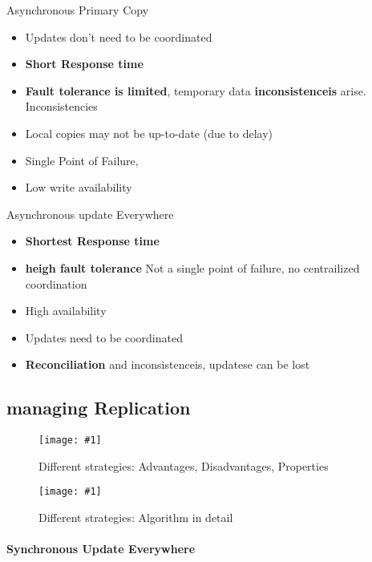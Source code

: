 \documentclass[a4paper,12pt]{article}%
\newcommand{\grafik}[2]{\begin{figure}[!htb]
		\noindent\texttt{[image: \#1]}
		\caption{\textrm{#2}}%
	\end{figure}}
\begin{document}
 Asynchronous Primary Copy
 
 {\color[HTML]{9AB299} 
 \begin{itemize}
  \item Updates don't need to be coordinated
  \item {\bf Short Response time}
 \end{itemize}

 }   
{\color[HTML]{A38C8C}
 \begin{itemize}
 \item {\bf Fault tolerance is limited}, temporary data {\bf inconsistenceis} arise. Inconsistencies 
 \item Local copies may not be up-to-date (due to delay)
 \item Single Point of Failure,
 \item Low write availability
 \end{itemize}
 }

 
 
 Asynchronous update Everywhere
 
 {\color[HTML]{9AB299} 
 \begin{itemize}
  \item {\bf Shortest Response time}
  \item {\bf heigh fault tolerance} Not a single point of failure, no centrailized coordination
  \item High availability
 \end{itemize}

 }   
{\color[HTML]{A38C8C}
 \begin{itemize}
 \item Updates need to be coordinated
 \item {\bf Reconciliation} and inconsistenceis, updatese can be lost 
 \end{itemize}
 }
 
 
 
 
 \fi
 
 \newpage
 \subsection{managing Replication}
 
 
 
 
 \grafik{zusa2/01.png}{Different strategies: Advantages, Disadvantages, Properties}
 \grafik{zusa2/02.png}{Different strategies: Algorithm in detail}
 
 \paragraph{Synchronous Update Everywhere}
 
\end{document}
